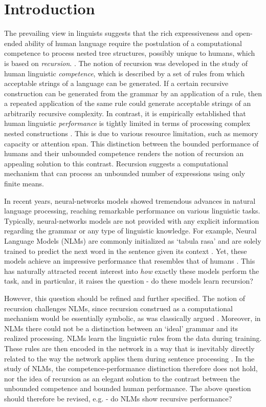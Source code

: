 \section{Introduction}
The prevailing view in linguists suggests that the rich expressiveness and open-ended ability of human language require the postulation of a computational competence to process nested tree structures, possibly unique to humans, which is based on \textit{recursion}. \cite{Chomsky:1957, Hauser:etal:2002, Dehaene:etal:2015}. The notion of recursion was developed in the study of human linguistic \textit{competence}, which is described by a set of rules from which acceptable strings of a language can be generated. If a certain recursive construction can be generated from the grammar by an application of a rule, then a repeated application of the same rule could generate acceptable strings of an arbitrarily recursive complexity. In contrast, it is empirically established that human linguistic \textit{performance} is tightly limited in terms of processing complex nested constructions \citep{}. This is due to various resource limitation, such as memory capacity or attention span. This distinction between the bounded performance of humans and their unbounded competence renders the notion of recursion an appealing solution to this contrast. Recursion suggests a computational mechanism that can process an unbounded number of expressions using only finite means.

In recent years, neural-networks models showed tremendous advances in natural language processing, reaching remarkable performance on various linguistic tasks. Typically, neural-networks models are not provided with any explicit information regarding the grammar or any type of linguistic knowledge. For example, Neural Language Models (NLMs) are commonly initialized as `tabula rasa' and are solely trained to predict the next word in the sentence given its context \citep{Elman:1990}. Yet, these models achieve an impressive performance that resembles that of humans \citep{}. This has naturally attracted recent interest into \textit{how} exactly these models perform the task, and in particular, it raises the question - do these models learn recursion?

However, this question should be refined and further specified. The notion of recursion challenges NLMs, since recursion construed as a computational mechanism would be essentially symbolic, as was classically argued \citep{Fodor:Pylyshyn:1988}. Moreover, in NLMs there could not be a distinction between an `ideal' grammar and its realized processing. NLMs learn the linguistic rules from the data during training. These rules are then encoded in the network in a way that is inevitably directly related to the way the network applies them during sentence processing \citep{van_gelder}. In the study of NLMs, the competence-performance distinction therefore does not hold, nor the idea of recursion as an elegant solution to the contrast between the unbounded competence and bounded human performance. The above question should therefore be revised, e.g. - do NLMs show recursive performance?

